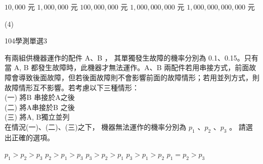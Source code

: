 \begin{QUESTIONS}
\begin{QUESTION}
\begin{QBODY}
		\begin{QOPS}
			\QOP $10,000$ 元
			\QOP $1,000,000$ 元
			\QOP $100,000,000$ 元
			\QOP $1,000,000,000$ 元
			\QOP $1,000,000,000,000$ 元
		\end{QOPS}
        \end{QBODY}
        \begin{QFROMS}
        \end{QFROMS}
        \begin{QTAGS}\end{QTAGS}
        \begin{QANS}
            (4)
        \end{QANS}
        \begin{QSOLLIST}
        \end{QSOLLIST}
        \begin{QEMPTYSPACE}
        \end{QEMPTYSPACE}
    \end{QUESTION}
    \begin{QUESTION}
        \begin{ExamInfo}{104}{學測}{單選}{3}
        \end{ExamInfo}
        \begin{ExamAnsRateInfo}{57}{78}{60}{33}
        \end{ExamAnsRateInfo}
        \begin{QBODY}
            有兩組供機器運作的配件 A、B ， 其單獨發生故障的機率分別為 0.1、0.15。只有當 A, B 都發生故障時，此機器才無法運作。A、B 兩配件若用串接方式，前面故障會導致後面故障，但若後面故障則不會影響前面的故障情形；若用並列方式，則故障情形互不影響。若考慮以下三種情形：\\
			(一) 將B 串接於A之後\\
			(二) 將A串接於B 之後\\
			(三) 將A, B獨立並列\\
			在情況(一)、(二)、(三)之下， 機器無法運作的機率分別為 ${{p}_{1}}$ 、${{p}_{2}}$ 、${{p}_{3}}$ 。
			請選出正確的選項。
			\begin{QOPS}
				\QOP ${{p}_{1}}>{{p}_{2}}>{{p}_{3}}$
				\QOP ${{p}_{2}}>{{p}_{1}}>{{p}_{3}}$
				\QOP ${{p}_{3}}>{{p}_{2}}>{{p}_{1}}$
				\QOP ${{p}_{3}}>{{p}_{1}}>{{p}_{2}}$
				\QOP ${{p}_{1}}={{p}_{2}}>{{p}_{3}}$
			\end{QOPS}
        \end{QBODY}
        \begin{QFROMS}
        \end{QFROMS}
        \begin{QTAGS}\end{QTAGS}

\end{QUESTION}
\end{QUESTIONS}
